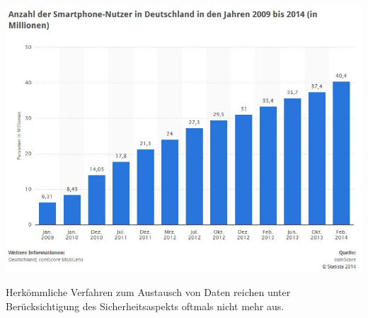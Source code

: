 \documentclass[10pt, a4paper,headsepline,pointednumbers]{scrreprt}
\begin{document}
\begin{center}
\includegraphics[scale=0.6]{smartphoneUser_Germany.JPG} 

\end{center}
Herkömmliche Verfahren zum Austausch von Daten reichen unter Berücksichtigung des Sicherheitsaspekts oftmals nicht mehr aus.
\end{document}
